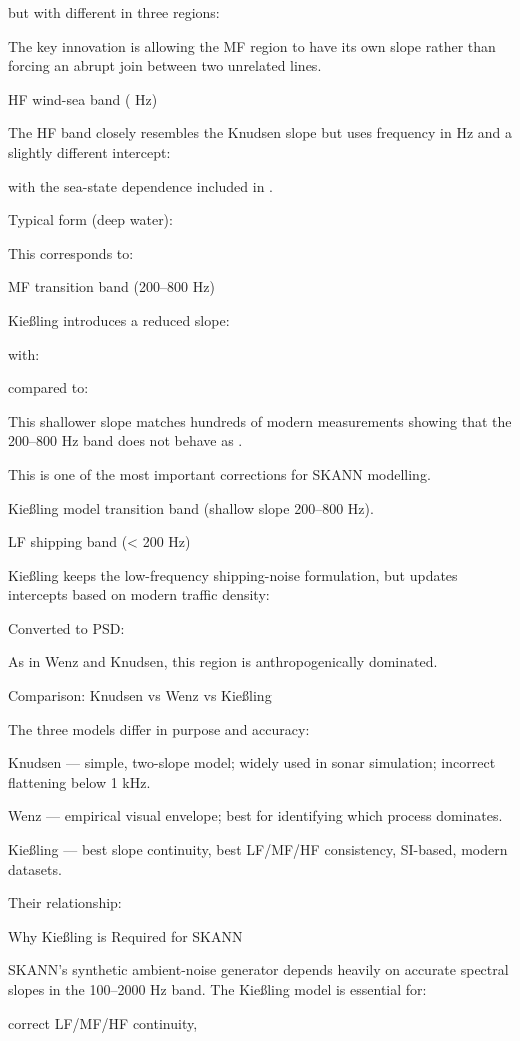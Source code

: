 \documentclass[12pt]{article}
\begin{document}
but with different  in three regions:


The key innovation is allowing the MF region to have its own slope rather than forcing an abrupt join between two unrelated lines.

HF wind-sea band ( Hz)

The HF band closely resembles the Knudsen slope but uses frequency in Hz and a slightly different intercept:


with the sea-state dependence included in .

Typical form (deep water):


This corresponds to:


MF transition band (200–800 Hz)

Kießling introduces a reduced slope:


with:


compared to:


This shallower slope matches hundreds of modern measurements showing that the 200–800 Hz band does not behave as .

This is one of the most important corrections for SKANN modelling.

Kießling model transition band (shallow slope 200–800 Hz).

LF shipping band (< 200 Hz)

Kießling keeps the low-frequency shipping-noise formulation, but updates intercepts based on modern traffic density:


Converted to PSD:


As in Wenz and Knudsen, this region is anthropogenically dominated.

Comparison: Knudsen vs Wenz vs Kießling

The three models differ in purpose and accuracy:

Knudsen — simple, two-slope model; widely used in sonar simulation; incorrect flattening below 1 kHz.

Wenz — empirical visual envelope; best for identifying which process dominates.

Kießling — best slope continuity, best LF/MF/HF consistency, SI-based, modern datasets.

Their relationship:


Why Kießling is Required for SKANN

SKANN’s synthetic ambient-noise generator depends heavily on accurate spectral slopes in the 100–2000 Hz band. The Kießling model is essential for:

correct LF/MF/HF continuity,
\end{document}
